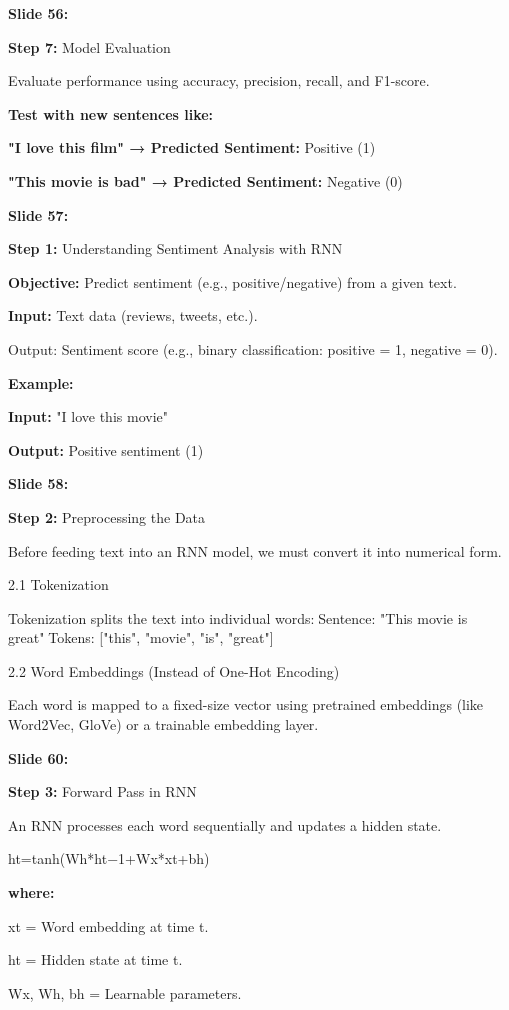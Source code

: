 \documentclass[11pt,a4paper]{article}
\begin{document}
\textbf{Slide 56:}

\textbf{Step 7:}  Model Evaluation

Evaluate performance using accuracy, precision, recall, and F1-score.

\textbf{Test with new sentences like:} 

\textbf{"I love this film" → Predicted Sentiment:}  Positive (1)

\textbf{"This movie is bad" → Predicted Sentiment:}  Negative (0)

\textbf{Slide 57:}

\textbf{Step 1:}  Understanding Sentiment Analysis with RNN

\textbf{Objective:}  Predict sentiment (e.g., positive/negative) from a given text.

\textbf{Input:}  Text data (reviews, tweets, etc.).

Output: Sentiment score (e.g., binary classification: positive = 1, negative = 0).

\textbf{Example:} 

\textbf{Input:}  "I love this movie"

\textbf{Output:}  Positive sentiment (1)

\textbf{Slide 58:}

\textbf{Step 2:}  Preprocessing the Data

Before feeding text into an RNN model, we must convert it into numerical form.

2.1 Tokenization

Tokenization splits the text into individual words:Sentence: "This movie is great"Tokens: ["this", "movie", "is", "great"]

2.2 Word Embeddings (Instead of One-Hot Encoding)

Each word is mapped to a fixed-size vector using pretrained embeddings (like Word2Vec, GloVe) or a trainable embedding layer.

\textbf{Slide 60:}

\textbf{Step 3:}  Forward Pass in RNN\

An RNN processes each word sequentially and updates a hidden state.

ht=tanh⁡(Wh*ht−1+Wx*xt+bh)

\textbf{where:} 

xt​ = Word embedding at time t.

ht​ = Hidden state at time t.

Wx​, Wh​, bh​ = Learnable parameters.
\end{document}

